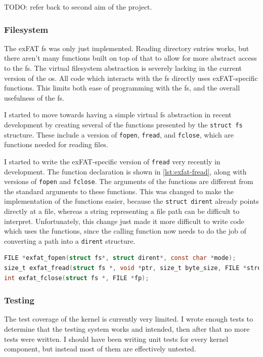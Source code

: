 \documentclass{article}
\begin{document}
TODO: refer back to second aim of the project.

\subsubsection{Filesystem}
The exFAT \gls{fs} was only just implemented. Reading directory entries works,
but there aren't many functions built on top of that to allow for more abstract
access to the \gls{fs}. The virtual filesystem abstraction is severely lacking
in the current version of the \gls{os}. All code which interacts with the
\gls{fs} directly uses exFAT-specific functions. This limits both ease of
programming with the \gls{fs}, and the overall usefulness of the \gls{fs}.

I started to move towards having a simple virtual \gls{fs} abstraction in
recent development by creating several of the functions presented by the
\verb!struct fs! structure. These include a version of \texttt{fopen},
\texttt{fread}, and \texttt{fclose}, which are functions needed for reading
files.

I started to write the exFAT-specific version of \texttt{fread} very recently
in development. The function declaration is shown in \autoref{lst:exfat-fread},
along with versions of \texttt{fopen} and \texttt{fclose}. The arguments of the
functions are different from the standard arguments to these functions. This
was changed to make the implementation of the functions easier, because the
\verb!struct dirent! already points directly at a file, whereas a string
representing a file path can be difficult to interpret. Unfortunately, this
change just made it more difficult to write code which uses the functions,
since the calling function now needs to do the job of converting a path into a
\verb!dirent! structure.

\begin{lstlisting}[language=C, caption={Function declarations of the exFAT
                   versions of \texttt{fopen}, \texttt{fread}, and
                   \texttt{fclose}.}, float, label={lst:exfat-fread}]
FILE *exfat_fopen(struct fs*, struct dirent*, const char *mode);
size_t exfat_fread(struct fs *, void *ptr, size_t byte_size, FILE *stream);
int exfat_fclose(struct fs *, FILE *fp);
\end{lstlisting}

\subsubsection{Testing}
The test coverage of the kernel is currently very limited. I wrote enough tests
to determine that the testing system works and intended, then after that no
more tests were written. I should have been writing unit tests for every kernel
component, but instead most of them are effectively untested.
\end{document}
